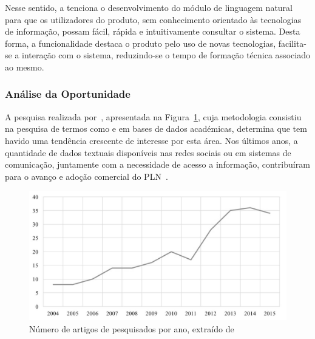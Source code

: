 Nesse sentido, a {\companyname} tenciona o desenvolvimento do módulo de linguagem natural para que os utilizadores do produto, sem conhecimento orientado às tecnologias de informação, possam fácil, rápida e intuitivamente consultar o sistema. Desta forma, a funcionalidade destaca o produto pelo uso de novas tecnologias, facilita-se a interação com o sistema, reduzindo-se o tempo de formação técnica associado ao mesmo. 

\subsubsection*{Análise da Oportunidade}

A pesquisa realizada por~\textcite{roadmap_nlp_research_is}, apresentada na Figura~\ref{fig:number_articles_per_year_nlp}, cuja metodologia consistiu na pesquisa de termos como  e  em bases de dados académicas, determina que tem havido uma tendência crescente de interesse por esta área. Nos últimos anos, a quantidade de dados textuais disponíveis nas redes sociais ou em sistemas de comunicação, juntamente com a necessidade de acesso a informação, contribuíram para o avanço e adoção comercial do \gls{PLN}~\parencite{roadmap_nlp_research_is}.

\begin{figure}[!ht]
    \centering
    \includegraphics[width=.9\textwidth]{ch2/assets/number_articles_nlp.jpg}
    \caption{Número de artigos de  pesquisados por ano, extraído de~\textcite{roadmap_nlp_research_is}}
    \label{fig:number_articles_per_year_nlp}
\end{figure}

